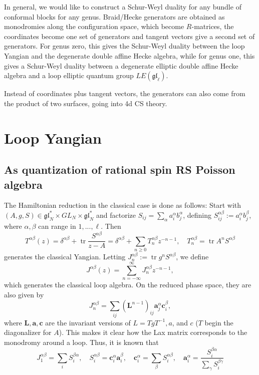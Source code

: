 \documentclass[11pt]{report}
\theoremstyle{definition}
\theoremstyle{remark}
\theoremstyle{remark}
\begin{document}
In general, we would like to construct a Schur-Weyl duality for any bundle of conformal blocks for any genus. Braid/Hecke generators are obtained as monodromies along the configuration space, which become $R$-matrices, the coordinates become one set of generators and tangent vectors give a second set of generators. For genus zero, this gives the Schur-Weyl duality between the loop Yangian and the degenerate double affine Hecke algebra, while for genus one, this gives a Schur-Weyl duality between a degenerate elliptic double affine Hecke algebra and a loop elliptic quantum group $LE(\mathfrak{gl}_\ell)$.

Instead of coordinates plus tangent vectors, the generators can also come from the product of two surfaces, going into 4d CS theory.

\section{Loop Yangian}

\subsection{As quantization of rational spin RS Poisson algebra}

\cite{article:arutyunov:1998}

The Hamiltonian reduction in the classical case is done as follows: Start with $(A,g,S) \in \mathfrak{gl}_N^* \times GL_N \times \mathfrak{gl}_N^*$ and factorize $S_{ij} = \sum_\alpha a_i^\alpha b_j^\alpha$, defining $S_{ij}^{\alpha\beta} := a_i^\alpha b_j^\beta$, where $\alpha,\beta$ can range in $1,...,\ell$. Then
\begin{equation*}
T^{\alpha\beta}(z) = \delta^{\alpha\beta} + \operatorname{tr} \frac{S^{\alpha\beta}}{z-A} = \delta^{\alpha\beta}+\sum_{n\geq 0} T_n^{\alpha\beta} z^{-n-1}, \quad T_n^{\alpha\beta} = \operatorname{tr} A^n S^{\alpha \beta}
\end{equation*}
generates the classical Yangian. Letting $J_n^{\alpha\beta} := \operatorname{tr} g^n S^{\alpha \beta}$, we define
\begin{equation*}
J^{\alpha \beta}(z) = \sum_{n=-\infty}^\infty J_n^{\alpha \beta} z^{-n-1},
\end{equation*}
which generates the classical loop algebra. On the reduced phase space, they are also given by
\begin{equation*}
J_n^{\alpha\beta} = \sum_{ij} (\mathbf{L}^{n-1})_{ij} \mathbf{a}_j^\alpha \mathbf{c}_i^\beta,
\end{equation*}
where $\mathbf{L},\mathbf{a},\mathbf{c}$ are the invariant versions of $L = TgT^{-1},a$, and $c$ ($T$ begin the diagonalizer for $A$). This makes it clear how the Lax matrix corresponds to the monodromy around a loop. Thus, it is known that
\begin{equation*}
J_1^{\alpha\beta} = \sum_i S_i^{\beta\alpha}, \quad S_i^{\alpha\beta} = \mathbf{c}_i^\alpha \mathbf{a}_i^\beta, \quad \mathbf{c}_i^\alpha = \sum_\beta S_i^{\alpha\beta}, \quad \mathbf{a}_i^\alpha = \frac{S_i^{\beta\alpha}}{\sum_\gamma S_i^{\beta\gamma}}
\end{equation*}
\end{document}
